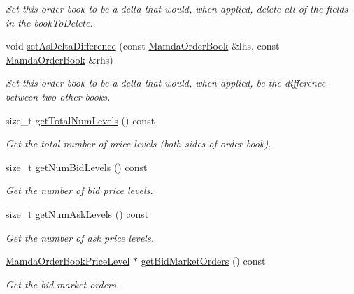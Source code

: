 \begin{CompactItemize}
\begin{CompactList}\small\item\em Set this order book to be a delta that would, when applied, delete all of the fields in the book\-To\-Delete. \item\end{CompactList}\item 
void \hyperlink{classWombat_1_1MamdaOrderBook_73888fb2449dab613730a7cb81ea772d}{set\-As\-Delta\-Difference} (const \hyperlink{classWombat_1_1MamdaOrderBook}{Mamda\-Order\-Book} \&lhs, const \hyperlink{classWombat_1_1MamdaOrderBook}{Mamda\-Order\-Book} \&rhs)
\begin{CompactList}\small\item\em Set this order book to be a delta that would, when applied, be the difference between two other books. \item\end{CompactList}\item 
size\_\-t \hyperlink{classWombat_1_1MamdaOrderBook_4adce908276fbd03b2d670ef7774fb70}{get\-Total\-Num\-Levels} () const 
\begin{CompactList}\small\item\em Get the total number of price levels (both sides of order book). \item\end{CompactList}\item 
size\_\-t \hyperlink{classWombat_1_1MamdaOrderBook_7dccd978f9d8e7e873a96862d48d2946}{get\-Num\-Bid\-Levels} () const 
\begin{CompactList}\small\item\em Get the number of bid price levels. \item\end{CompactList}\item 
size\_\-t \hyperlink{classWombat_1_1MamdaOrderBook_0badd234b16c9cd5450aa9d6075d0f29}{get\-Num\-Ask\-Levels} () const 
\begin{CompactList}\small\item\em Get the number of ask price levels. \item\end{CompactList}\item 
\hyperlink{classWombat_1_1MamdaOrderBookPriceLevel}{Mamda\-Order\-Book\-Price\-Level} $\ast$ \hyperlink{classWombat_1_1MamdaOrderBook_738ccfa6cee1c6c7aef52c8726433157}{get\-Bid\-Market\-Orders} () const 
\begin{CompactList}\small\item\em Get the bid market orders. \item\end{CompactList}\item 

\end{CompactItemize}

